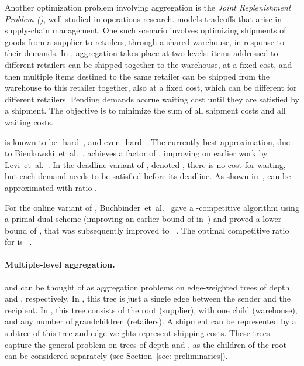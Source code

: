 \documentclass[a4paper]{article}
\newcommand{\etal}{et~al.}
\begin{document}
Another optimization problem involving aggregation is the \emph{Joint Replenishment Problem
()}, well-studied in operations research.
 models tradeoffs that arise in supply-chain management.
One such scenario involves optimizing shipments of goods from a
supplier to  retailers, through a shared warehouse, in response to their
demands.  In , aggregation takes place at two levels: items addressed to
different retailers can be shipped together to the warehouse, at a fixed cost,
and then multiple items destined to the same retailer can be shipped  from the warehouse to
this retailer together, also at a fixed cost, which can be  different for different
retailers. Pending demands accrue waiting cost until they are satisfied by a shipment.
The objective is to minimize the sum of all shipment costs and all waiting costs.

 is known to be -hard~\cite{jrp-arkin}, and
even -hard~\cite{jrp-deadlines-nonner,bienkowski_jrpd_2013}.
The currently best approximation,
due to Bienkowski~{\etal}~\cite{jrp-soda-2014}, achieves a factor of ,
improving on earlier work by
Levi~{\etal}~\cite{jrp-owmr-levi-soda,jrp-owmr-levi-journal,jrp-owmr-levi-approx}.
In the deadline variant of , denoted ,
there is no cost for waiting, but each demand needs to be satisfied before its deadline.
As shown in~\cite{bienkowski_jrpd_2013},  can be approximated with ratio .

For the online variant of ,
Buchbinder~{\etal}~\cite{jrp-online-buchbinder} gave a -competitive algorithm using
a primal-dual scheme (improving an earlier bound of  in~\cite{aggregation-bkv})
and proved a lower bound of , that was subsequently
improved to ~\cite{jrp-soda-2014}.
The optimal competitive ratio for  is ~\cite{jrp-soda-2014}.


\paragraph{Multiple-level aggregation.}  

 and  can be
thought of as aggregation problems on edge-weighted trees of depth  and ,
respectively. In , this tree is just a single edge between the sender 
and the recipient. In , this tree consists of the root (supplier),
with one child (warehouse), and any number of grandchildren (retailers).
A shipment can be represented by a subtree of this tree and edge weights represent
shipping costs. These trees capture the general
problem on trees of depth  and , as the children of the root can
be considered separately (see Section~\ref{sec: preliminaries}).
\end{document}

